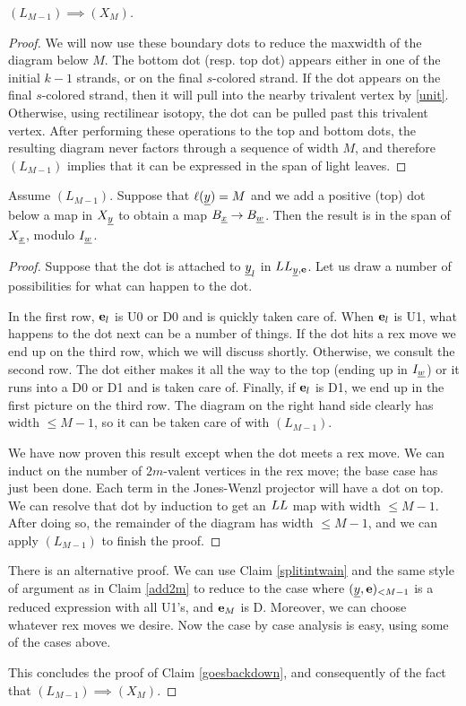 \begin{proof}[$(L_{M-1}) \implies (X_M)$]
\begin{proof}
We will now use these boundary dots to reduce the maxwidth of the diagram below $M$. The bottom dot (resp. top dot) appears either in one of the initial $k-1$ strands, or on the final
$s$-colored strand. If the dot appears on the final $s$-colored strand, then it will pull into the nearby trivalent vertex by \eqref{unit}. Otherwise, using rectilinear isotopy, the dot
can be pulled past this trivalent vertex. After performing these operations to the top and bottom dots, the resulting diagram never factors through a sequence of width $M$, and therefore
$(L_{M-1})$ implies that it can be expressed in the span of light leaves. \end{proof}

\begin{claim} \label{addposdot} Assume $(L_{M-1})$. Suppose that $\ell({\underline{y}})=M$ and we add a positive (top) dot below a map in $X_{\underline{y}}$ to obtain a map $B_{\underline{x}} \rightarrow B_{\underline{w}}$. Then the result is in
the span of $X_{\underline{x}}$, modulo $I_{\underline{w}}$. \end{claim}

\begin{proof} Suppose that the dot is attached to ${\underline{y}}_l$ in $LL_{{\underline{y}},{\mathbf e}}$. Let us draw a number of possibilities for what can happen to the dot.


In the first row, ${\mathbf e}_l$ is U0 or D0 and is quickly taken care of. When ${\mathbf e}_l$ is U1, what happens to the dot next can be a number of things. If the dot hits a rex move we end up on the
third row, which we will discuss shortly. Otherwise, we consult the second row. The dot either makes it all the way to the top (ending up in $I_{\underline{w}}$) or it runs into a D0 or D1 and is
taken care of. Finally, if ${\mathbf e}_l$ is D1, we end up in the first picture on the third row. The diagram on the right hand side clearly has width $\le M-1$, so it can be taken care of with
$(L_{M-1})$.

We have now proven this result except when the dot meets a rex move. We can induct on the number of $2m$-valent vertices in the rex move; the base case has just been done. Each term in the
Jones-Wenzl projector will have a dot on top. We can resolve that dot by induction to get an $LL$ map with width $\le M-1$. After doing so, the remainder of the diagram has width $\le
M-1$, and we can apply $(L_{M-1})$ to finish the proof. \end{proof}

\begin{remark} There is an alternative proof. We can use Claim \ref{splitintwain} and the same style of argument as in Claim \ref{add2m} to reduce to the case where $({\underline{y}},{\mathbf e})_{<
M-1}$ is a reduced expression with all U1's, and ${\mathbf e}_M$ is D. Moreover, we can choose whatever rex moves we desire. Now the case by case analysis is easy, using some of the cases above.
\end{remark}

This concludes the proof of Claim \ref{goesbackdown}, and consequently of the fact that $(L_{M-1}) \implies (X_M)$. \end{proof}

